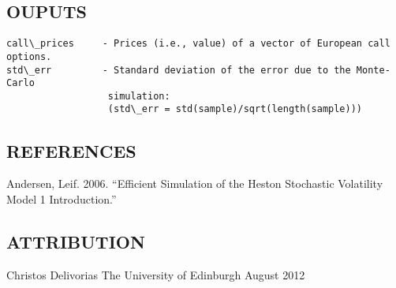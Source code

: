 \subsection*{OUPUTS}

\begin{verbatim}call\_prices     - Prices (i.e., value) of a vector of European call options.
std\_err         - Standard deviation of the error due to the Monte-Carlo
                  simulation:
                  (std\_err = std(sample)/sqrt(length(sample)))\end{verbatim}


\subsection*{REFERENCES}

\begin{par}
[AN06] Andersen, Leif. 2006. “Efficient Simulation of the Heston Stochastic Volatility Model 1 Introduction.”
\end{par} \vspace{1em}


\subsection*{ATTRIBUTION}

\begin{par}
Christos  Delivorias The University of Edinburgh August 2012
\end{par} \vspace{1em}


